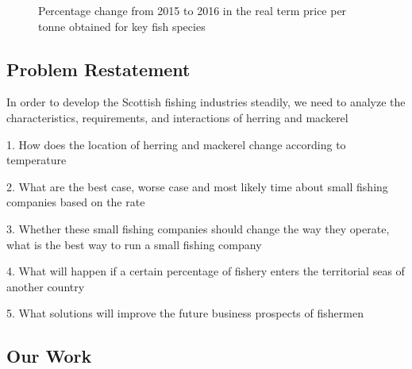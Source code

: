 \documentclass{mcmthesis}
\begin{document}
\begin{figure}[tbp]
  \caption{ Percentage change from 2015 to 2016 in the real term price per tonne obtained for key fish species}\label{figure3}
\end{figure}

\subsection{Problem Restatement}
In order to develop the Scottish fishing industries steadily,   we need to analyze the characteristics, requirements, and interactions of herring and mackerel

1.    How does the location of herring and mackerel change according to temperature

2.    What are the best case, worse case and most likely time about  small fishing companies  based on the rate 


3.    Whether these small fishing companies should change the way they operate, what is the best way to run a small fishing company
 
4.    What will happen if a certain percentage of fishery enters the territorial seas of another country

5.    What solutions will improve the future business prospects of fishermen



\subsection{Our Work}
\end{document}
